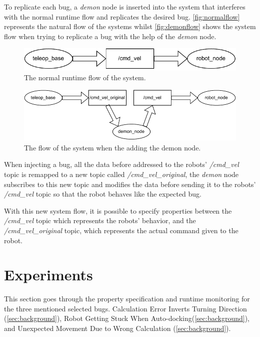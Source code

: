 To replicate each bug, a \textit{demon} node is inserted into the system that interferes with the normal runtime flow and replicates the desired bug. \autoref{fig:normalflow} represents the natural flow of the systems whilst \autoref{fig:demonflow} shows the system flow when trying to replicate a bug with the help of the \textit{demon} node.

\begin{figure}
\includegraphics[width=\textwidth]{images/normal_flow.pdf}
\caption{The normal runtime flow of the system.} \label{fig:normalflow}
\end{figure}
    
\begin{figure}
\includegraphics[width=\textwidth]{images/demon_flow.pdf}
\caption{The flow of the system when the adding the demon node.} \label{fig:demonflow}
\end{figure}

When injecting a bug, all the data before addressed to the robots' \textit{/cmd\_vel} topic is remapped to a new topic called \textit{/cmd\_vel\_original}, the \textit{demon} node subscribes to this new topic and modifies the data before sending it to the robots' \textit{/cmd\_vel} topic so that the robot behaves like the expected bug. 

With this new system flow, it is possible to specify properties between the \textit{/cmd\_vel} topic which represents the robots' behavior, and the \textit{/cmd\_vel\_original} topic, which represents the actual command given to the robot.


\section{Experiments}
\label{sec:experiments}

This section goes through the property specification and runtime monitoring for the three mentioned selected bugs. Calculation Error Inverts Turning Direction (\autoref{sec:background}), Robot Getting Stuck When Auto-docking(\autoref{sec:background}), and Unexpected Movement Due to Wrong Calculation (\autoref{sec:background}).


